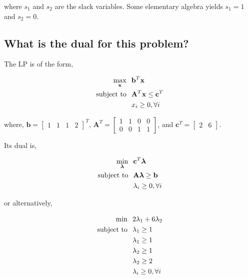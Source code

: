 \documentclass{article}
\begin{document}
\noindent where $s_1$ and $s_2$ are the slack variables. Some elementary algebra yields $s_1 = 1$ and $s_2 = 0$.

\subsection{What is the dual for this problem?}

The LP is of the form,

\begin{align*}
\max_\mathbf{x} & \hspace{0.1in} \mathbf{b}^T \mathbf{x}\\
\text{subject to} & \hspace{0.1in} \mathbf{A}^T \mathbf{x} \le \mathbf{c}^T\\
& \hspace{0.1in} x_i \ge 0, \forall i
\end{align*}

\noindent where, $\mathbf{b} = \begin{bmatrix}1 & 1 & 1 & 2\end{bmatrix}^T$, $\mathbf{A}^T = \left[\begin{smallmatrix}1 & 1 & 0 & 0\\0 & 0 & 1 & 1\end{smallmatrix}\right]$, and $\mathbf{c}^T = \begin{bmatrix} 2 & 6 \end{bmatrix}$.

Its dual is,

\begin{align*}
\min_{\boldsymbol{\lambda}} & \hspace{0.1in} \mathbf{c}^T \boldsymbol{\lambda}\\
\text{subject to} & \hspace{0.1in} \mathbf{A} \boldsymbol{\lambda} \ge \mathbf{b}\\
& \hspace{0.1in} \lambda_i \ge 0, \forall i
\end{align*}

or alternatively,

\begin{align*}
\text{min} & \hspace{0.1in} 2\lambda_1 + 6\lambda_2\\
\text{subject to} & \hspace{0.1in} \lambda_1 \ge 1\\
& \hspace{0.1in} \lambda_1 \ge 1\\
& \hspace{0.1in} \lambda_2 \ge 1\\
& \hspace{0.1in} \lambda_2 \ge 2\\
& \hspace{0.1in} \lambda_i \ge 0, \forall i
\end{align*}
\end{document}
